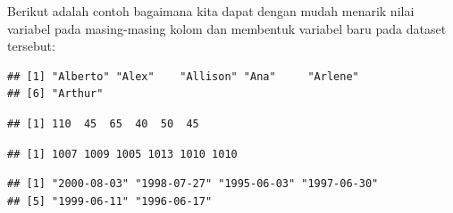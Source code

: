\documentclass[]{book}
\newenvironment{Shaded}{\begin{snugshade}}{\end{snugshade}}
\newcommand{\StringTok}[1]{\textcolor[rgb]{0.31,0.60,0.02}{#1}}
\newcommand{\CommentTok}[1]{\textcolor[rgb]{0.56,0.35,0.01}{\textit{#1}}}
\newcommand{\OperatorTok}[1]{\textcolor[rgb]{0.81,0.36,0.00}{\textbf{#1}}}
\newcommand{\NormalTok}[1]{#1}
\begin{document}
Berikut adalah contoh bagaimana kita dapat dengan mudah menarik nilai
variabel pada masing-masing kolom dan membentuk variabel baru pada
dataset tersebut:

\begin{Shaded}
\end{Shaded}

\begin{verbatim}
## [1] "Alberto" "Alex"    "Allison" "Ana"     "Arlene" 
## [6] "Arthur"
\end{verbatim}

\begin{Shaded}
\end{Shaded}

\begin{verbatim}
## [1] 110  45  65  40  50  45
\end{verbatim}

\begin{Shaded}
\end{Shaded}

\begin{verbatim}
## [1] 1007 1009 1005 1013 1010 1010
\end{verbatim}

\begin{Shaded}
\end{Shaded}

\begin{verbatim}
## [1] "2000-08-03" "1998-07-27" "1995-06-03" "1997-06-30"
## [5] "1999-06-11" "1996-06-17"
\end{verbatim}

\begin{Shaded}
\end{Shaded}
\end{document}

